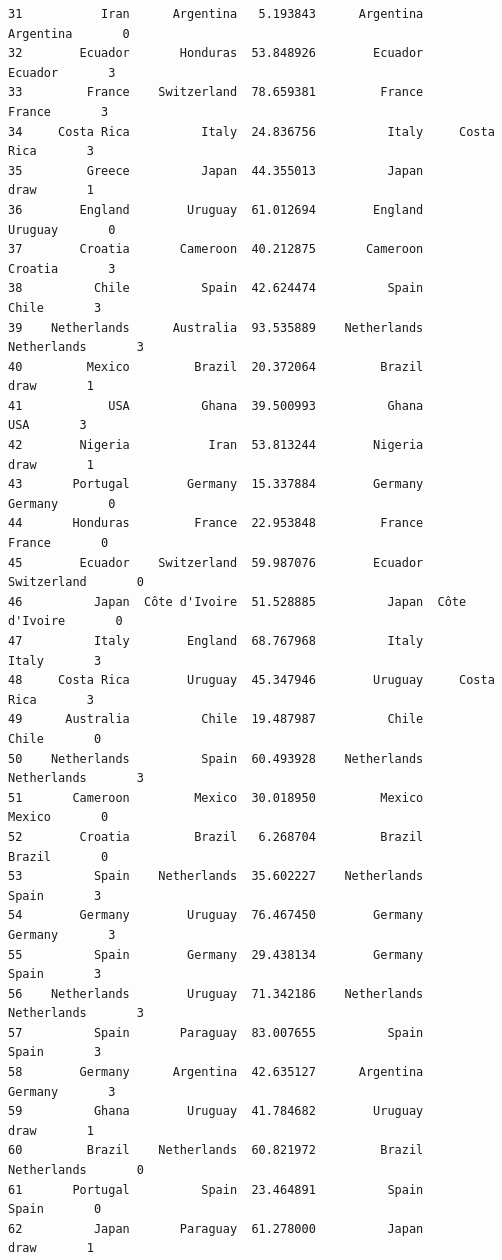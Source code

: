 \documentclass[12pt,fleqn]{article}\usepackage{common}
\begin{document}
\begin{verbatim}
31           Iran      Argentina   5.193843      Argentina      Argentina       0
32        Ecuador       Honduras  53.848926        Ecuador        Ecuador       3
33         France    Switzerland  78.659381         France         France       3
34     Costa Rica          Italy  24.836756          Italy     Costa Rica       3
35         Greece          Japan  44.355013          Japan           draw       1
36        England        Uruguay  61.012694        England        Uruguay       0
37        Croatia       Cameroon  40.212875       Cameroon        Croatia       3
38          Chile          Spain  42.624474          Spain          Chile       3
39    Netherlands      Australia  93.535889    Netherlands    Netherlands       3
40         Mexico         Brazil  20.372064         Brazil           draw       1
41            USA          Ghana  39.500993          Ghana            USA       3
42        Nigeria           Iran  53.813244        Nigeria           draw       1
43       Portugal        Germany  15.337884        Germany        Germany       0
44       Honduras         France  22.953848         France         France       0
45        Ecuador    Switzerland  59.987076        Ecuador    Switzerland       0
46          Japan  Côte d'Ivoire  51.528885          Japan  Côte d'Ivoire       0
47          Italy        England  68.767968          Italy          Italy       3
48     Costa Rica        Uruguay  45.347946        Uruguay     Costa Rica       3
49      Australia          Chile  19.487987          Chile          Chile       0
50    Netherlands          Spain  60.493928    Netherlands    Netherlands       3
51       Cameroon         Mexico  30.018950         Mexico         Mexico       0
52        Croatia         Brazil   6.268704         Brazil         Brazil       0
53          Spain    Netherlands  35.602227    Netherlands          Spain       3
54        Germany        Uruguay  76.467450        Germany        Germany       3
55          Spain        Germany  29.438134        Germany          Spain       3
56    Netherlands        Uruguay  71.342186    Netherlands    Netherlands       3
57          Spain       Paraguay  83.007655          Spain          Spain       3
58        Germany      Argentina  42.635127      Argentina        Germany       3
59          Ghana        Uruguay  41.784682        Uruguay           draw       1
60         Brazil    Netherlands  60.821972         Brazil    Netherlands       0
61       Portugal          Spain  23.464891          Spain          Spain       0
62          Japan       Paraguay  61.278000          Japan           draw       1

\end{verbatim}
\end{document}
